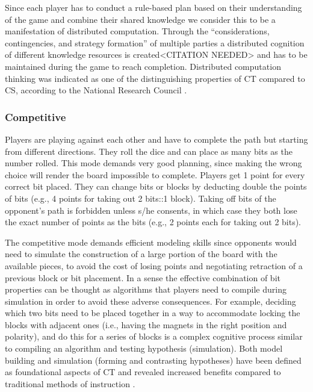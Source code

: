 \documentclass{acm_proc_article-sp}
\begin{document}
Since each player has to conduct a rule-based plan based on their understanding of the game and combine their shared knowledge we consider this to be a manifestation of distributed computation.
Through the ``considerations, contingencies, and strategy formation'' of multiple parties a distributed cognition of different knowledge resources is created<CITATION NEEDED>\cite{} and has to be maintained during the game to reach completion.
Distributed computation thinking was indicated as one of the distinguishing properties of CT compared to CS, according to the National Research Council \cite{national2010report}.

\subsubsection{Competitive}
Players are playing against each other and have to complete the path but starting from different directions.
They roll the dice and can place as many bits as the number rolled.
This mode demands very good planning, since making the wrong choice will render the board impossible to complete. Players get 1 point for every correct bit placed.
They can change bits or blocks by deducting double the points of bits (e.g., 4 points for taking out 2 bits::1 block). 
Taking off bits of the opponent's path is forbidden unless s/he consents, in which case they both lose the exact number of points as the bits (e.g., 2 points each for taking out 2 bits).

The competitive mode demands efficient modeling skills since opponents would need to simulate the construction of a large portion of the board with the available pieces, to avoid the cost of losing points and negotiating retraction of a previous block or bit placement.
In a sense the effective combination of bit properties can be thought as algorithms that players need to compile during simulation in order to avoid these adverse consequences.
For example, deciding which two bits need to be placed together in a way to accommodate locking the blocks with adjacent ones (i.e., having the magnets in the right position and polarity), and do this for a series of blocks is a complex cognitive process similar to compiling an algorithm and testing hypothesis (simulation).
Both model building and simulation (forming and contrasting hypotheses) have been defined as foundational aspects of CT and revealed increased benefits compared to traditional methods of instruction \cite{wilensky2006thinking}.
\end{document}
